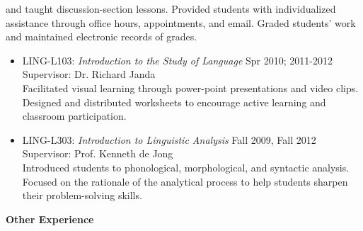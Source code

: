 \begin{singlespace}
\vspace{6pt}
 and taught discussion-section lessons. Provided students with individualized assistance through office hours, appointments, and email. Graded students' work and maintained electronic records of grades.
\vspace{3pt}
\begin{itemize} \itemsep6pt
\item{LING-L103:} \textit{Introduction to the Study of Language} \hfill Spr 2010; 2011-2012 \\
Supervisor: Dr. Richard Janda \\
\noindent Facilitated visual learning through power-point presentations and video clips. Designed and distributed worksheets to encourage active learning and classroom participation.
\item LING-L303: \textit{Introduction to Linguistic Analysis}
\hfill Fall 2009, Fall 2012 \\
Supervisor: Prof. Kenneth de Jong \\
Introduced students to phonological, morphological, and syntactic analysis. Focused on the rationale of the analytical process to help students sharpen their problem-solving skills.
\end{itemize}
\vspace{20pt}
\centerline{\textbf{ Other Experience}}

\end{singlespace}
